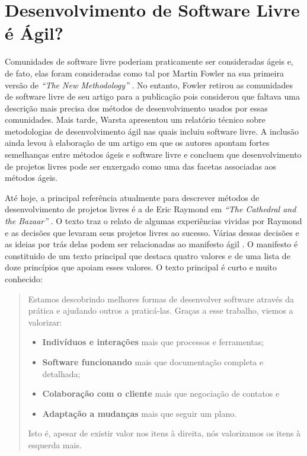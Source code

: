 \chapter{Desenvolvimento de Software Livre é Ágil?}
\label{cap:foss}

Comunidades de software livre poderiam praticamente ser consideradas
ágeis e, de fato, elas foram consideradas como tal por Martin Fowler
na sua primeira versão de \emph{``The New Methodology''}
\cite{Fowler00orig}. No entanto, Fowler retirou as comunidades de
software livre de seu artigo para a publicação pois considerou que
faltava uma descrição mais precisa dos métodos de desenvolvimento
usados por essas comunidades. Mais tarde, Warsta \cite{Warsta2002}
apresentou um relatório técnico sobre metodologias de desenvolvimento
ágil nas quais incluiu software livre. A inclusão ainda levou à
elaboração de um artigo \cite{Warsta2003} em que os autores apontam
fortes semelhanças entre métodos ágeis e software livre e concluem que
desenvolvimento de projetos livres pode ser enxergado como uma das
facetas associadas aos métodos ágeis.

Até hoje, a principal referência atualmente para descrever métodos de
desenvolvimento de projetos livres é a de Eric Raymond em \emph{``The
  Cathedral and the Bazaar''} \cite{Raymond1999}. O texto traz o
relato de algumas experiências vividas por Raymond e as decisões que
levaram seus projetos livres ao sucesso. Várias dessas decisões e as
ideias por trás delas podem ser relacionadas ao manifesto ágil
\cite{AgileManifesto}. O manifesto é constituido de um texto principal
que destaca quatro valores e de uma lista de doze princípios que
apoiam esses valores. O texto principal é curto e muito conhecido:

\begin{quote}
  Estamos descobrindo melhores formas de desenvolver software através
  da prática e ajudando outros a praticá-las. Graças a esse trabalho,
  viemos a valorizar:

  \begin{center}
    \begin{itemize}
    \item \textbf{Indivíduos e interações} mais que processos e
      ferramentas;
    \item \textbf{Software funcionando} mais que documentação completa
      e detalhada;
    \item \textbf{Colaboração com o cliente} mais que negociação de
      contatos e
    \item \textbf{Adaptação a mudanças} mais que seguir um plano.
    \end{itemize}
  \end{center}

  Isto é, apesar de existir valor nos itens à direita, nós valorizamos
  os itens à esquerda mais.
\end{quote}


